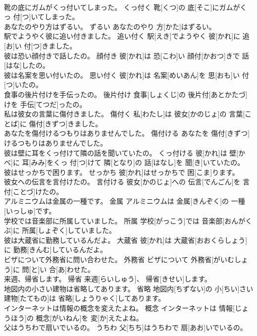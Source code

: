 \documentclass[8pt]{extreport}
\begin{document}
\begin{CJK}{UTF8}{min}
\\	靴の底にガムがくっ付いてしまった。	くっ付く	靴[くつ]の 底[そこ]にガムがくっ 付[つ]いてしまった。	
\\	あなたのやり方はずるい。	ずるい	あなたのやり 方[かた]はずるい。	
\\	駅でようやく彼に追い付きました。	追い付く	駅[えき]でようやく 彼[かれ]に 追[お]い 付[つ]きました。	
\\	彼は恐い顔付きで話したの。	顔付き	彼[かれ]は 恐[こわ]い 顔付[かおつ]きで 話[はな]したの。	
\\	彼は名案を思い付いたの。	思い付く	彼[かれ]は 名案[めいあん]を 思[おも]い 付[つ]いたの。	
\\	食事の後片付けを手伝ったの。	後片付け	食事[しょくじ]の 後片付[あとかたづ]けを 手伝[てつだ]ったの。	
\\	私は彼女の言葉に傷付きました。	傷付く	私[わたし]は 彼女[かのじょ]の 言葉[ことば]に 傷付[きずつ]きました。	
\\	あなたを傷付けるつもりはありませんでした。	傷付ける	あなたを 傷付[きずつ]けるつもりはありませんでした。	
\\	彼は壁に耳をくっ付けて隣の話を聞いていたの。	くっ付ける	彼[かれ]は 壁[かべ]に 耳[みみ]をくっ 付[つ]けて 隣[となり]の 話[はなし]を 聞[き]いていたの。	
\\	彼はせっかちで困ります。	せっかち	彼[かれ]はせっかちで 困[こま]ります。	
\\	彼女への伝言を言付けたの。	言付ける	彼女[かのじょ]への 伝言[でんごん]を 言付[ことづ]けたの。	
\\	アルミニウムは金属の一種です。	金属	アルミニウムは 金属[きんぞく]の 一種[いっしゅ]です。	
\\	学校では音楽部に所属していました。	所属	学校[がっこう]では 音楽部[おんがくぶ]に 所属[しょぞく]していました。	
\\	彼は大蔵省に勤務しているんだよ。	大蔵省	彼[かれ]は 大蔵省[おおくらしょう]に 勤務[きんむ]しているんだよ。	
\\	ビザについて外務省に問い合わせた。	外務省	ビザについて 外務省[がいむしょう]に 問[と]い 合[あ]わせた。	
\\	来週、帰省します。	帰省	来週[らいしゅう]、 帰省[きせい]します。	
\\	地図内の小さい建物は省略してあります。	省略	地図内[ちずない]の 小[ちい]さい 建物[たてもの]は 省略[しょうりゃく]してあります。	
\\	インターネットは情報の概念を変えたよね。	概念	インターネットは 情報[じょうほう]の 概念[がいねん]を 変[か]えたよね。	
\\	父はうちわで扇いでいるの。	うちわ	父[ちち]はうちわで 扇[あお]いでいるの。	

\end{CJK}
\end{document}

